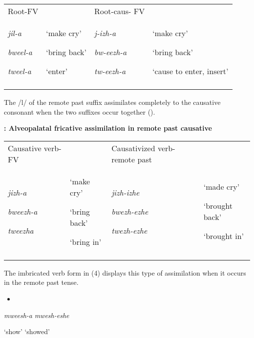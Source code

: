\documentclass[output=paper]{langsci/langscibook}
\begin{document}
\begin{tabularx}{\textwidth}{XXXX}
\lsptoprule
Root-FV &  & Root-caus- FV & \\
{\emph{jil-a }}

{\emph{bweel-a}}

\emph{tweel-a} & {‘make cry’}

{‘bring back’}

‘enter’ & {\emph{j-izh-a }}

{\emph{bw-eezh-a }}

\emph{tw-eezh-a} & {‘make cry’}

{‘bring back’}

‘cause to enter, insert’\\
\lspbottomrule
\end{tabularx}
The /l/ of the remote past suffix assimilates completely to the causative consonant when the two suffixes occur together ().

\textbf{:  Alveopalatal fricative assimilation in remote past causative}

\begin{tabularx}{\textwidth}{XXXX}
\lsptoprule
Causative verb-FV &  & Causativized verb-remote past & \\
{\emph{jizh-a }}

{\emph{bweezh-a }}

\emph{tweezha} & {‘make cry’}

{‘bring back’}

‘bring in’ & {\emph{jizh-izhe }}

{\emph{bwezh-ezhe }}

\emph{twezh-ezhe} & {‘made cry’}

{‘brought back’}

‘brought in’\\
\lspbottomrule
\end{tabularx}
The imbricated verb form in (4) displays this type of assimilation when it occurs in the remote past tense. 

\begin{itemize}
\item \end{itemize}
\begin{stylelsSourceline}
\emph{mweesh-a}    \emph{mwesh-eshe}  
\end{stylelsSourceline}

\begin{stylelsTranslation}
‘show’    ‘showed’
\end{stylelsTranslation}
\end{document}
